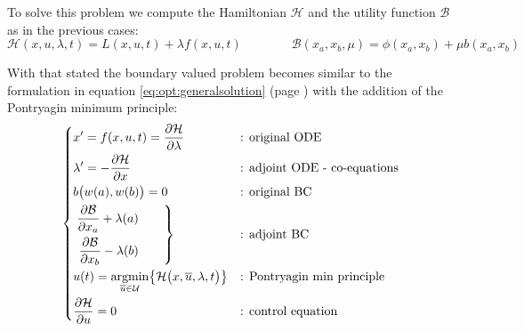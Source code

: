 To solve this problem we compute the Hamiltonian $\mathcal H$ and the utility function $\mathcal B$ as in the previous cases:
\[ \mathcal H (x,u, \lambda,t) = L(x,u,t) + \lambda f(x,u,t) \qquad \qquad \mathcal B (x_a,x_b,\mu) = \phi(x_a,x_b) + \mu b(x_a,x_b) \]

With that stated the boundary valued problem becomes similar to the formulation in equation \ref{eq:opt:generalsolution} (page \pageref{eq:opt:generalsolution}) with the addition of the Pontryagin minimum principle:
\begin{equation} 
	\left\{ \begin{aligned}
		& x' = f(x,u,t) = \frac{\partial \mathcal H}{\partial \lambda} && \textrm{: original ODE} \\
		&\lambda' = - \frac{\partial \mathcal H}{\partial x} && \textrm{: adjoint ODE - co-equations} \\
		&b\big(w(a),w(b)\big) = 0 && \textrm{: original BC} \\
		&\left. \begin{aligned}
			\frac{\partial \mathcal B}{\partial x_a} + \lambda(a) \\
			\frac{\partial \mathcal B}{\partial x_b} - \lambda(b)
		\end{aligned} \qquad \right\} &&\textrm{: adjoint BC} \\
		& u(t) = \underset{\overline u \in \mathcal U}{\textrm{argmin}} \big\{ \mathcal{H}\big(x, \overline u,\lambda, t\big) \big\} && \textrm{: Pontryagin min principle} \\
		& \frac{\partial \mathcal H}{\partial u} = 0 && \textrm{: control equation}			
	\end{aligned} \right. 
\end{equation}



